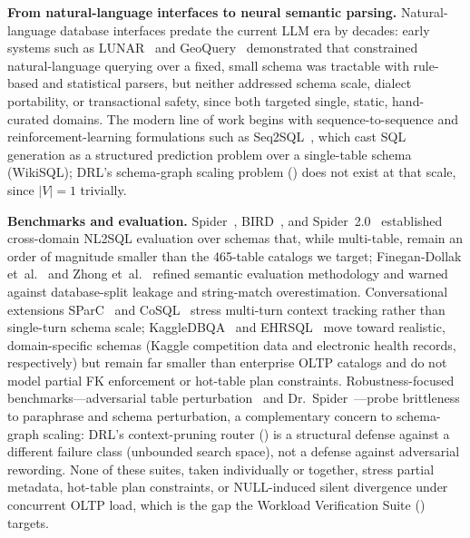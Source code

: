 \documentclass[twocolumn]{svjour3}
\begin{document}
\textbf{From natural-language interfaces to neural semantic parsing.}
Natural-language database interfaces predate the current LLM era by decades: early systems such as LUNAR~\cite{woods1973progress} and GeoQuery~\cite{zelle1996geoquery} demonstrated that constrained natural-language querying over a fixed, small schema was tractable with rule-based and statistical parsers, but neither addressed schema scale, dialect portability, or transactional safety, since both targeted single, static, hand-curated domains.
The modern line of work begins with sequence-to-sequence and reinforcement-learning formulations such as Seq2SQL~\cite{zhong2017seq2sql}, which cast SQL generation as a structured prediction problem over a single-table schema (WikiSQL); DRL's schema-graph scaling problem () does not exist at that scale, since $|V|{=}1$ trivially.

\textbf{Benchmarks and evaluation.}
Spider~\cite{yu2018spider}, BIRD~\cite{li2023can}, and Spider~2.0~\cite{lei2024spider2} established cross-domain NL2SQL evaluation over schemas that, while multi-table, remain an order of magnitude smaller than the 465-table catalogs we target; Finegan-Dollak et~al.~\cite{finegan2018improving} and Zhong et~al.~\cite{zhong2020semantic} refined semantic evaluation methodology and warned against database-split leakage and string-match overestimation.
Conversational extensions SParC~\cite{yu2019sparc} and CoSQL~\cite{yu2019cosql} stress multi-turn context tracking rather than single-turn schema scale; KaggleDBQA~\cite{lee2021kaggledbqa} and EHRSQL~\cite{lee2022ehrsql} move toward realistic, domain-specific schemas (Kaggle competition data and electronic health records, respectively) but remain far smaller than enterprise OLTP catalogs and do not model partial FK enforcement or hot-table plan constraints.
Robustness-focused benchmarks---adversarial table perturbation~\cite{gan2021towards} and Dr.~Spider~\cite{chang2023dr}---probe brittleness to paraphrase and schema perturbation, a complementary concern to schema-graph scaling: DRL's context-pruning router () is a structural defense against a different failure class (unbounded search space), not a defense against adversarial rewording.
None of these suites, taken individually or together, stress partial metadata, hot-table plan constraints, or NULL-induced silent divergence under concurrent OLTP load, which is the gap the Workload Verification Suite () targets.
\end{document}
